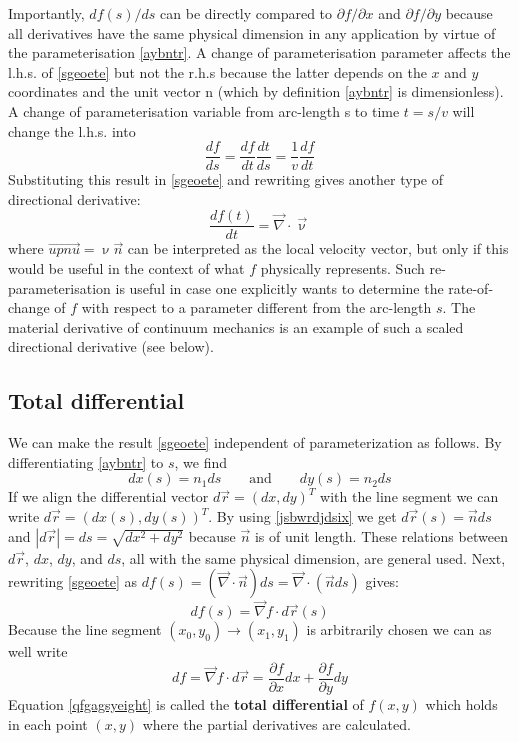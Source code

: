 Importantly,
$df(s)/ds$ can be directly compared to $\partial f/\partial x$ and 
$\partial f/\partial y$ because all derivatives have the
same physical dimension in any application by virtue of the parameterisation \eqref{aybntr}. 
A change of parameterisation parameter affects the l.h.s. of \eqref{sgeoete}
but not the r.h.s because the latter depends on the $x$ and $y$ 
coordinates and the unit vector n (which by definition \eqref{aybntr} is
dimensionless). A change of parameterisation variable from arc-length s to time $t=s/v$ will
change the l.h.s. into
\[
\frac{df}{ds} = \frac{df}{dt} \frac{dt}{ds} = \frac{1}{v} \frac{df}{dt}
\]
Substituting this result in \eqref{sgeoete} and rewriting gives another type of directional derivative:
\[
\frac{df(t)}{dt} = \vec\nabla \cdot \vec{\upnu}
\]
where $\vec{upnu}=\upnu \vec{n}$ can be interpreted as the local velocity vector, 
but only if this would be useful
in the context of what $f$ physically represents. Such re-parameterisation is useful in case
one explicitly wants to determine the rate-of-change of $f$ with respect to a parameter
different from the arc-length $s$. The material derivative of continuum mechanics is an
example of such a scaled directional derivative (see below).



\subsection{Total differential}

We can make the result \eqref{sgeoete} independent of parameterization as follows. 
By differentiating \eqref{aybntr} to $s$, we find
\begin{equation}
dx(s) = n_1 ds \qquad \text{and} \qquad dy(s)=n_2 ds
\label{jsbwrdjdsix}
\end{equation}
If we align the differential vector $d\vec{r}=(dx,dy)^T$ 
with the line segment we can write $d\vec{r} = (dx(s),dy(s))^T$.
By using \eqref{jsbwrdjdsix} we get $d\vec{r}(s)=\vec{n} ds$ 
and $|d\vec{r}|=ds = \sqrt{dx^2+dy^2}$ because $\vec{n}$ is 
of unit length.
These relations between $d\vec{r}$, $dx$, $dy$, and $ds$, all with the same physical dimension,
are general used.
Next, rewriting \eqref{sgeoete} as $df(s)=(\vec\nabla \cdot \vec{n})ds = \vec\nabla \cdot (\vec{n} ds)$
gives:
\[
df(s) = \vec\nabla f \cdot d\vec{r}(s)
\]
Because the line segment $(x_0,y_0)\rightarrow(x_1,y_1)$ is arbitrarily chosen we can as well write
\begin{equation}
df = \vec\nabla f \cdot d\vec{r} 
= \frac{\partial f}{\partial x} dx + \frac{\partial f}{\partial y} dy
\label{qfgagsyeight}
\end{equation}
Equation \eqref{qfgagsyeight} is called the {\bf total differential} of $f(x,y)$ 
which holds in each point $(x,y)$ where the partial derivatives are calculated.

